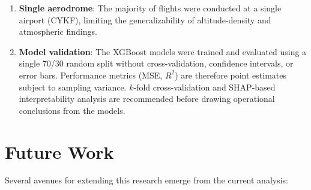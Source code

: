 \documentclass[11pt,a4paper]{article}
\begin{document}
\begin{enumerate}
    \item \textbf{Single aerodrome}: The majority of flights were conducted at a single airport (CYKF), limiting the generalizability of altitude-density and atmospheric findings.

    \item \textbf{Model validation}: The XGBoost models were trained and evaluated using a single 70/30 random split without cross-validation, confidence intervals, or error bars. Performance metrics (MSE, $R^2$) are therefore point estimates subject to sampling variance. $k$-fold cross-validation and SHAP-based interpretability analysis are recommended before drawing operational conclusions from the models.
\end{enumerate}

\section{Future Work}

Several avenues for extending this research emerge from the current analysis:
\end{document}
